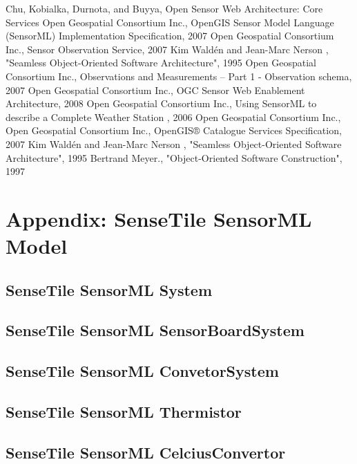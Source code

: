\documentclass[]{final_report}
\begin{document}
\newpage
\begin{thebibliography}{99}
 Chu, Kobialka,  Durnota, and  Buyya, Open Sensor Web Architecture: Core Services
Open Geospatial Consortium Inc., OpenGIS Sensor Model Language (SensorML) Implementation Specification, 2007
Open Geospatial Consortium Inc.,  Sensor Observation Service, 2007
Kim Waldén and Jean-Marc Nerson , "Seamless Object-Oriented Software Architecture", 1995
Open Geospatial Consortium Inc., Observations and Measurements – Part 1 - Observation schema, 2007
Open Geospatial Consortium Inc., OGC Sensor Web Enablement Architecture, 2008
Open Geospatial Consortium Inc., Using SensorML to describe a
Complete Weather Station , 2006
Open Geospatial Consortium Inc.,
Open Geospatial Consortium Inc., OpenGIS® Catalogue Services Specification, 2007
Kim Waldén and Jean-Marc Nerson , "Seamless Object-Oriented Software Architecture", 1995
Bertrand Meyer., "Object-Oriented Software Construction", 1997

\end{thebibliography}



\appendix
\chapter{Appendix: SenseTile SensorML Model}
\section{SenseTile SensorML System}
\section{SenseTile SensorML SensorBoardSystem}
\section{SenseTile SensorML ConvetorSystem}
\section{SenseTile SensorML Thermistor}

\section{SenseTile SensorML CelciusConvertor}
\end{document}
